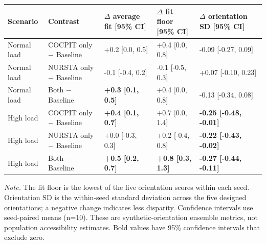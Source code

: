 \begin{tabular}{lllll}
\toprule
\textbf{Scenario} & \textbf{Contrast} & \textbf{\ensuremath{\Delta} average fit [95\% CI]} & \textbf{\ensuremath{\Delta} fit floor [95\% CI]} & \textbf{\ensuremath{\Delta} orientation SD [95\% CI]} \\
\midrule
Normal load & COCPIT only \ensuremath{-} Baseline & +0.2 [0.0, 0.5] & +0.4 [0.0, 0.8] & -0.09 [-0.27, 0.09] \\
Normal load & NURSTA only \ensuremath{-} Baseline & -0.1 [-0.4, 0.2] & -0.1 [-0.5, 0.3] & +0.07 [-0.10, 0.23] \\
Normal load & Both \ensuremath{-} Baseline & \textbf{+0.3 [0.1, 0.5]} & +0.4 [0.0, 0.8] & -0.13 [-0.34, 0.08] \\
\addlinespace[2pt]
High load & COCPIT only \ensuremath{-} Baseline & \textbf{+0.4 [0.1, 0.7]} & +0.7 [0.0, 1.4] & \textbf{-0.25 [-0.48, -0.01]} \\
High load & NURSTA only \ensuremath{-} Baseline & +0.0 [-0.3, 0.3] & +0.2 [-0.4, 0.8] & \textbf{-0.22 [-0.43, -0.02]} \\
High load & Both \ensuremath{-} Baseline & \textbf{+0.5 [0.2, 0.7]} & \textbf{+0.8 [0.3, 1.3]} & \textbf{-0.27 [-0.44, -0.11]} \\
\bottomrule
\end{tabular}

\par\footnotesize\textit{Note.} The fit floor is the lowest of the five orientation scores within each seed. Orientation SD is the within-seed standard deviation across the five designed orientations; a negative change indicates less disparity. Confidence intervals use seed-paired means (n=10). These are synthetic-orientation ensemble metrics, not population accessibility estimates. Bold values have 95\% confidence intervals that exclude zero.
